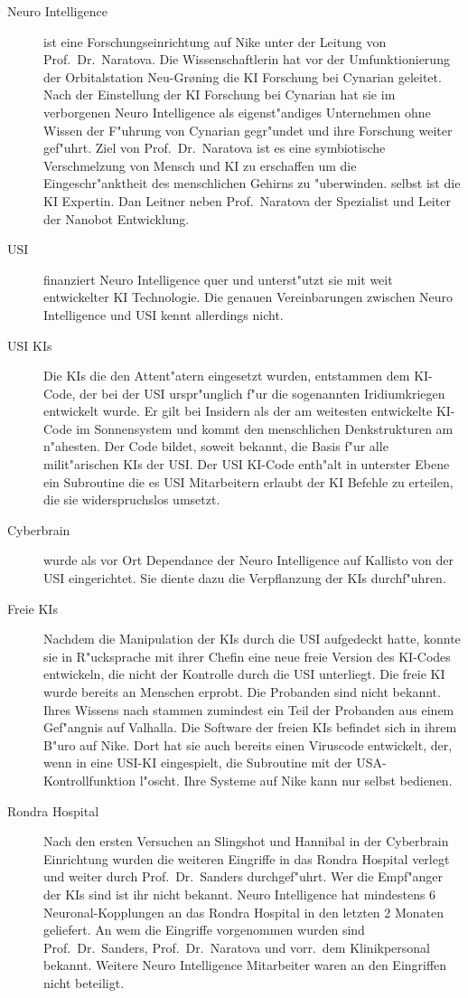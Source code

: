 \begin{description}
	\item[Neuro Intelligence] ist eine Forschungseinrichtung auf Nike unter der Leitung von Prof.~Dr.~Naratova. Die Wissenschaftlerin hat 
		vor der Umfunktionierung der Orbitalstation Neu-Gr{\o}ning die KI Forschung bei Cynarian geleitet. Nach der Einstellung der KI Forschung bei Cynarian hat sie im verborgenen Neuro Intelligence als eigenst"andiges Unternehmen ohne Wissen der F"uhrung von Cynarian gegr"undet und ihre Forschung weiter gef"uhrt. Ziel von Prof.~Dr.~Naratova ist es eine symbiotische Verschmelzung von Mensch und KI zu erschaffen um die Eingeschr"anktheit des menschlichen Gehirns zu "uberwinden. \ml{} selbst ist die KI Expertin. Dan Leitner neben Prof.~Naratova der Spezialist und Leiter der Nanobot Entwicklung.
	\item[USI] finanziert Neuro Intelligence quer und unterst"utzt sie mit weit entwickelter KI Technologie. Die genauen Vereinbarungen 
		zwischen Neuro Intelligence und USI kennt \ml{} allerdings nicht.
    \item[USI KIs] Die KIs die den Attent"atern eingesetzt wurden, entstammen dem KI-Code, der bei der USI urspr"unglich f"ur die  
		sogenannten Iridiumkriegen entwickelt wurde. Er gilt bei Insidern als der am weitesten entwickelte KI-Code im Sonnensystem und kommt den menschlichen Denkstrukturen am n"ahesten. Der Code bildet, soweit \ml{} bekannt, die Basis f"ur alle milit"arischen KIs der USI. Der USI KI-Code enth"alt in unterster Ebene ein Subroutine die es USI Mitarbeitern erlaubt der KI Befehle zu erteilen, die sie widerspruchslos umsetzt.
	\item[Cyberbrain] wurde als vor Ort Dependance der Neuro Intelligence auf Kallisto von der USI eingerichtet. Sie diente dazu die		
		Verpflanzung der KIs durchf"uhren.
	\item[Freie KIs] Nachdem \ml{} die Manipulation der KIs durch die USI aufgedeckt hatte, konnte sie in R"ucksprache mit ihrer Chefin 
		eine neue freie Version des KI-Codes entwickeln, die nicht der Kontrolle durch die USI unterliegt. Die freie KI wurde bereits an Menschen erprobt. Die Probanden sind \ml{} nicht bekannt. Ihres Wissens nach stammen zumindest ein Teil der Probanden aus einem Gef"angnis auf Valhalla. Die Software der freien KIs befindet sich in ihrem B"uro auf Nike. Dort hat sie auch bereits einen Viruscode entwickelt, der, wenn in eine USI-KI eingespielt, die Subroutine mit der USA-Kontrollfunktion l"oscht. Ihre Systeme auf Nike kann \ml{} nur selbst bedienen.
	\item[Rondra Hospital] Nach den ersten Versuchen an Slingshot und Hannibal in der Cyberbrain Einrichtung wurden die weiteren Eingriffe 	
		in das Rondra Hospital verlegt und weiter durch Prof.~Dr.~Sanders durchgef"uhrt. Wer die Empf"anger der KIs sind ist ihr nicht bekannt. Neuro Intelligence hat mindestens 6 Neuronal-Kopplungen an das Rondra Hospital in den letzten 2 Monaten geliefert. An wem die Eingriffe vorgenommen wurden sind Prof.~Dr.~Sanders, Prof.~Dr.~Naratova und vorr.~dem Klinikpersonal bekannt. Weitere Neuro Intelligence Mitarbeiter waren an den Eingriffen nicht beteiligt.
\end{description}

